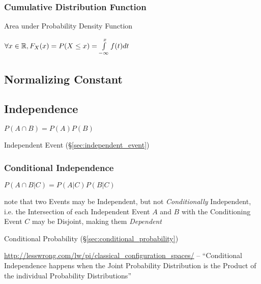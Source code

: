 \subsubsection{Cumulative Distribution Function}
\label{sec:cumulative_distribution}

Area under Probability Density Function

$\forall x \in \mathbb{R}, F_X(x) = P(X \leq x) = \int\limits_{-\infty}^x
f(t) dt$



\subsection{Normalizing Constant}\label{sec:normalizing_constant}

\subsection{Independence}\label{sec:independence}

$P(A \cap B) = P(A)P(B)$

\fist Independent Event (\S\ref{sec:independent_event})



\subsubsection{Conditional Independence}\label{sec:conditional_independence}

$P(A \cap B | C) = P(A|C)P(B|C)$

note that two Events may be Independent, but not \emph{Conditionally}
Independent, i.e. the Intersection of each Independent Event $A$ and $B$ with
the Conditioning Event $C$ may be Disjoint, making them \emph{Dependent}

\fist Conditional Probability (\S\ref{sec:conditional_probability})

\url{http://lesswrong.com/lw/pi/classical_configuration_spaces/}
-- ``Conditional Independence happens when the Joint Probability Distribution
is the Product of the individual Probability Distributions''



